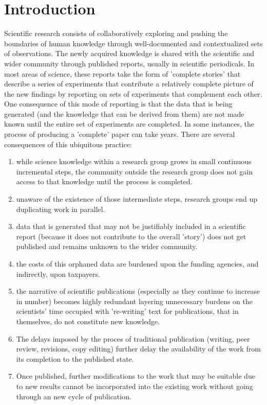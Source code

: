 \documentclass[final,authoryear,3p]{elsarticle-open-drafting}
\begin{document}
\section{Introduction}
Scientific research consists of collaboratively exploring and pushing the boundaries of human knowledge through well-documented and contextualized sets of observations. The newly acquired knowledge is shared with the scientific and wider community through published reports, usually in scientific periodicals. In most areas of science, these reports take the form of 'complete stories' that describe a series of experiments that contribute a relatively complete picture of the new findings by reporting on sets of experiments that complement each other. One consequence of this mode of reporting is that the data that is being generated (and the knowledge that can be derived from them) are not made known until the entire set of experiments are completed. In some instances, the process of producing a 'complete' paper can take years.
There are several consequences of this ubiquitous practice:
\begin{enumerate}
\item while science knowledge within a research group grows in small continuous incremental steps, the community outside the research group does not gain access to that knowledge until the process is completed. 
\item unaware of the existence of those intermediate steps, research groups end up duplicating work in parallel. 
\item data that is generated that may not be justifiably included in a scientific report (because it does not contribute to the overall 'story') does not get published and remains unknown to the wider community. 
\item the costs of this orphaned data are burdened upon the funding agencies, and indirectly, upon taxpayers. 
\item the narrative of scientific publications (especially as they continue to increase in number) becomes highly redundant layering unnecessary burdens on the scientists' time occupied with 're-writing' text for publications, that in themselves, do not constitute new knowledge. 
\item The delays imposed by the proces of traditional publication (writing, peer review, revisions, copy editing) further delay the availability of the work from its completion to the published state. 
\item Once published, further modifications to the work that may be suitable due to new results cannot be incorporated into the existing work without going through an new cycle of publication. 
\end{enumerate}
\end{document}
